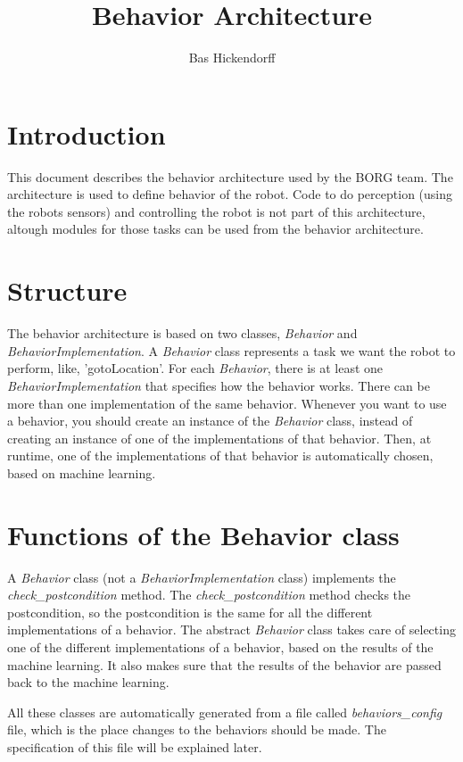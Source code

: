 \documentclass[a4paper, 10pt, oneside]{article}
\title{Behavior Architecture}
\author{Bas Hickendorff}
\newcommand{\cod}[1]{\emph{#1}}
\begin{document}
\maketitle


\section{Introduction}

This document describes the behavior architecture used by the BORG team. The architecture is used
to define behavior of the robot. Code to do perception (using the robots sensors) and controlling
the robot is not part of this architecture, altough modules for those tasks can be used from the
behavior architecture.


\section{Structure}

The behavior architecture is based on two classes, \cod{Behavior} and \cod{BehaviorImplementation}.
A \cod{Behavior} class represents a task we want the robot to perform, like, 'gotoLocation'. For
each \cod{Behavior}, there is at least one \cod{BehaviorImplementation} that specifies how the
behavior works. There can be more than one implementation of the same behavior. Whenever you want
to use a behavior, you should create an instance of the \cod{Behavior} class, instead of creating an
instance of one of the implementations of that behavior. Then, at runtime, one of the
implementations of that behavior is automatically chosen, based on machine learning.


\section{Functions of the Behavior class}

A \cod{Behavior} class (not a \cod{BehaviorImplementation} class) implements the
\cod{check\_postcondition} method. The \cod{check\_postcondition} method checks the postcondition,
so the postcondition is the same for all the different implementations of a behavior. The abstract
\cod{Behavior} class takes care of selecting one of the different implementations of a behavior,
based on the results of the machine learning. It also makes sure that the results of the behavior
are passed back to the machine learning.

All these classes are automatically generated from a file called \cod{behaviors\_config} file, which
is the place changes to the behaviors should be made. The specification of this file will be
explained later.
\end{document}
